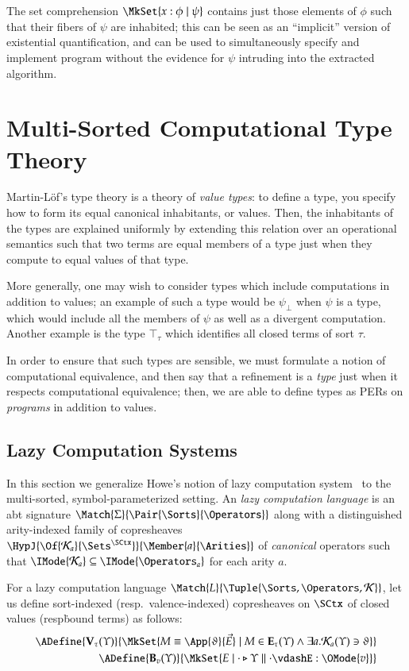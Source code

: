 \documentclass[11pt]{article}
\theoremstyle{definition}
\theoremstyle{notation}
\theoremstyle{remark}
\numberwithin{equation}{section}
\newcommand\IsSubsetEq[2]{\IMode{#1}\subseteq\IMode{#2}}
\newcommand\IsAbtUnmoded[5]{
  #1\triangleright%
  #2\parallel%
  #3\vdash%
  #4:\OMode{#5}%
}
\newcommand\TyTop[1]{\top_{#1}}
\newcommand\Exprs{\mathbf{E}}
\newcommand\Values{\mathbf{V}}
\newcommand\BTms{\mathbf{B}}
\begin{document}
The set comprehension $\MkSet{x:\phi\mid\psi}$ contains just those elements of
$\phi$ such that their fibers of $\psi$ are inhabited; this can be seen as an
``implicit'' version of existential quantification, and can be used to
simultaneously specify and implement program without the evidence for $\psi$
intruding into the extracted algorithm.

\section{Multi-Sorted Computational Type Theory}
\label{sec:ctt}

Martin-L\"of's type theory is a theory of \emph{value types}: to define a type,
you specify how to form its equal canonical inhabitants, or values. Then, the
inhabitants of the types are explained uniformly by extending this relation
over an operational semantics such that two terms are equal members of a
type just when they compute to equal values of that type.

More generally, one may wish to consider types which include computations in
addition to values; an example of such a type would be $\psi_\bot$ when $\psi$
is a type, which would include all the members of $\psi$ as well as a divergent
computation. Another example is the type $\TyTop{\tau}$ which identifies all
closed terms of sort $\tau$.

In order to ensure that such types are sensible, we must formulate a notion of
computational equivalence, and then say that a refinement is a \emph{type} just
when it respects computational equivalence; then, we are able to define types
as PERs on \emph{programs} in addition to values.


\subsection{Lazy Computation Systems}

In this section we generalize Howe's notion of lazy computation
system~\cite{howe:1989} to the multi-sorted, symbol-parameterized setting. An
\emph{lazy computation language} is an abt signature
$\Match{\Sigma}{\Pair{\Sorts}{\Operators}}$ along with a distinguished
arity-indexed family of copresheaves
$\HypJ{\Of{\CanOperators_a}{\Sets^\SCtx}}{\Member{a}{\Arities}}$ of
\emph{canonical} operators such that
$\IsSubsetEq{\CanOperators_a}{\Operators_a}$ for each arity $a$.

For a lazy computation language
$\Match{L}{\Tuple{\Sorts,\Operators,\CanOperators}}$, let us define
sort-indexed (resp.\ valence-indexed) copresheaves on $\SCtx$ of closed values
(resp\. bound terms) as follows:
\begin{align*}
  \ADefine{\Values_\tau(\Upsilon)}{
    \MkSet{
      M\equiv\App{\vartheta}{\vec{E}}
      \mid M\in\Exprs_\tau(\Upsilon)\land \exists a. \CanOperators_a(\Upsilon)\ni\vartheta
    }
  }\\
  \ADefine{
    \BTms_{v}(\Upsilon)
  }{
    \MkSet{E \mid \IsAbtUnmoded{\cdot}{\Upsilon}{\cdot}{E}{v}}
  }
\end{align*}
\end{document}
